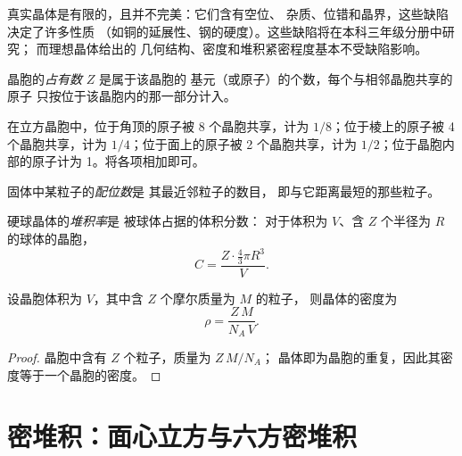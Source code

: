 \begin{remark}[真实晶体]\label{rem:b1:crystals-metals:real}
真实晶体是有限的，且并不完美：它们含有空位、
杂质、位错和晶界，这些缺陷决定了许多性质
（如铜的延展性、钢的硬度）。这些缺陷将在本科三年级分册中研究；
而理想晶体给出的
几何结构、密度和堆积紧密程度基本不受缺陷影响。
\end{remark}

\begin{definition}[晶胞的占有数]\label{def:b1:crystals-metals:multiplicity}
晶胞的\emph{占有数} $Z$ 是属于该晶胞的
基元（或原子）的个数，每个与相邻晶胞共享的原子
只按位于该晶胞内的那一部分计入。
\end{definition}

\begin{method}[数出晶胞中的原子数]\label{met:b1:crystals-metals:count}
在立方晶胞中，位于角顶的原子被 8 个晶胞共享，计为
$1/8$；位于棱上的原子被 4 个晶胞共享，计为 $1/4$；位于面上的原子被
2 个晶胞共享，计为 $1/2$；位于晶胞内部的原子计为 1。将各项相加即可。
\end{method}

\begin{definition}[配位数]\label{def:b1:crystals-metals:coordination}
固体中某粒子的\emph{配位数}是
其最近邻粒子的数目，
即与它距离最短的那些粒子。
\end{definition}

\begin{definition}[堆积率]\label{def:b1:crystals-metals:compactness}
硬球晶体的\emph{堆积率}是
被球体占据的体积分数：
对于体积为 $V$、含 $Z$ 个半径为 $R$ 的球体的晶胞，
\[
  C = \frac{Z \cdot \frac43 \pi R^3}{V} .
\]
\end{definition}

\begin{proposition}[由晶胞求密度]\label{prop:b1:crystals-metals:density}
设晶胞体积为 $V$，其中含 $Z$ 个摩尔质量为 $M$ 的粒子，
则晶体的密度为
\[
  \rho = \frac{Z\,M}{N_A\,V} .
\]
\end{proposition}

\begin{proof}
晶胞中含有 $Z$ 个粒子，质量为 $Z\,M/N_A$；
晶体即为晶胞的重复，因此其密度等于一个晶胞的密度。
\end{proof}

\section{密堆积：面心立方与六方密堆积}

